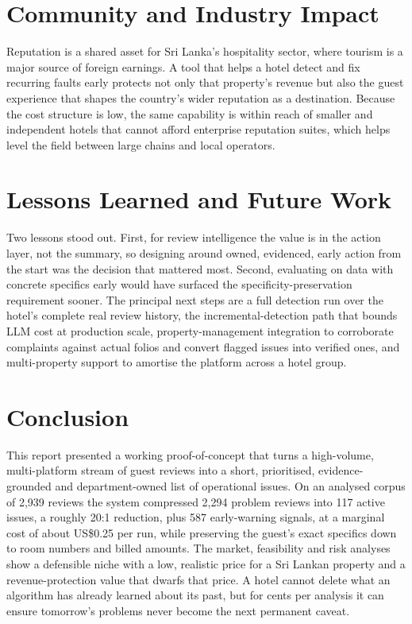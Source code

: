 \documentclass[11pt,a4paper]{article}
\begin{document}
\section{Community and Industry Impact}
\label{sec:impact}
Reputation is a shared asset for Sri Lanka's hospitality sector, where tourism is a major source of
foreign earnings. A tool that helps a hotel detect and fix recurring faults early protects not only that
property's revenue but also the guest experience that shapes the country's wider reputation as a
destination. Because the cost structure is low, the same capability is within reach of smaller and
independent hotels that cannot afford enterprise reputation suites, which helps level the field between
large chains and local operators.

\section{Lessons Learned and Future Work}
\label{sec:lessons}
Two lessons stood out. First, for review intelligence the value is in the action layer, not the summary,
so designing around owned, evidenced, early action from the start was the decision that mattered most.
Second, evaluating on data with concrete specifics early would have surfaced the specificity-preservation
requirement sooner. The principal next steps are a full detection run over the hotel's complete real
review history, the incremental-detection path that bounds LLM cost at production scale, property-management
integration to corroborate complaints against actual folios and convert flagged issues into verified
ones, and multi-property support to amortise the platform across a hotel group.

\section{Conclusion}
\label{sec:conclusion}
This report presented a working proof-of-concept that turns a high-volume, multi-platform stream of guest
reviews into a short, prioritised, evidence-grounded and department-owned list of operational issues. On
an analysed corpus of 2{,}939 reviews the system compressed 2{,}294 problem reviews into 117 active
issues, a roughly 20:1 reduction, plus 587 early-warning signals, at a marginal cost of about US\$0.25
per run, while preserving the guest's exact specifics down to room numbers and billed amounts. The market,
feasibility and risk analyses show a defensible niche with a low, realistic price for a Sri Lankan
property and a revenue-protection value that dwarfs that price. A hotel cannot delete what an algorithm
has already learned about its past, but for cents per analysis it can ensure tomorrow's problems never
become the next permanent caveat.
\end{document}

